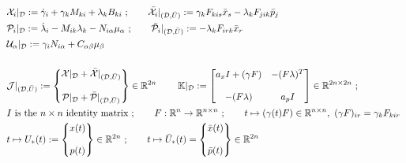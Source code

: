 \documentclass[11pt]{article}
\begin{document}
\begin{subequations}
    \allowdisplaybreaks
    \begin{align}
        & \calX_i|_\dee := \dot{\gamma}_i + \gamma_k M_{ki} + \lambda_k B_{ki} \ ; \qquad \bar{\calX}_i|_{(\dee,\bar{U})} := \gamma_k F_{kis} \bar{x}_s - \lambda_k F_{jik}\bar{p}_j \notag \\
        & \calP_i |_\dee := \dot{\lambda}_i - M_{ik} \lambda_k - N_{i \alpha} \mu_\alpha \ ; \qquad \bar{\calP}_i |_{(\dee,\bar{U})} := - \lambda_k F_{irk} \bar{x}_r \notag\\
        & \calU_\alpha |_\dee := \gamma_i N_{i \alpha} + C_{\alpha \beta} \mu_\beta  \notag \\
        \notag \\
        & \mathcal{J}|_{(\dee, \bar{U})} : = \begin{Bmatrix} \calX|_\dee + \bar{\calX}|_{(\dee, \bar{U})} \\ \\ \calP|_\dee + \bar{\calP}|_{(\dee, \bar{U})} \end{Bmatrix} \in \R^{2n}\; \qquad \K|_\dee := \begin{bmatrix} a_x I + (\gamma F) & -(F\lambda)^T   \\
                                                                  &   \\
                                                                  -(F \lambda) & a_p I \end{bmatrix} \in \R^{2n \times 2n} \ ; \notag\\
                                                                  &  I \mbox{ is the } n \times n \mbox{ identity matrix} \ ; \qquad F: \R^n \to \R^{n \times n} \ ; \qquad t \mapsto (\gamma(t) F) \in \R^{n \times n}, \ (\gamma F)_{ir} =\gamma_k F_{kir} \ \notag\\
        & t \mapsto U_*(t) := \begin{Bmatrix} x(t)  \\
                                    \\
                                  p(t)
                   \end{Bmatrix} \in \R^{2n} \ ; \qquad t \mapsto \bar{U}_*(t) = \begin{Bmatrix} \bar{x}(t) \\
                                                                \\
                                                             \bar{p}(t)
                                                        \end{Bmatrix} \in \R^{2n} \notag
    \end{align}
\end{subequations}
\end{document}
